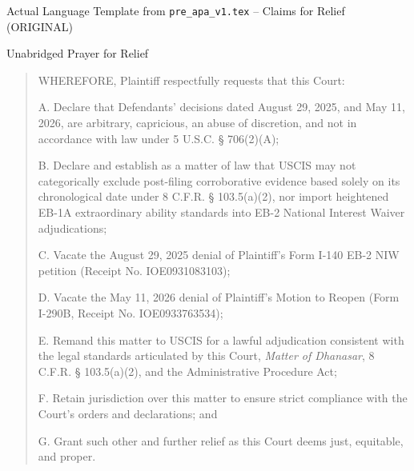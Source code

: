\documentclass[11pt]{beamer}
\begin{document}
	\begin{frame}[allowframebreaks]{Actual Language Template from \texttt{pre\_apa\_v1.tex} -- Claims for Relief (ORIGINAL)}
		\scriptsize
		\begin{block}{Unabridged Prayer for Relief}
			\begin{quote}
				WHEREFORE, Plaintiff respectfully requests that this Court:
				
				A. Declare that Defendants' decisions dated August 29, 2025, and May 11, 2026, are arbitrary, capricious, an abuse of discretion, and not in accordance with law under 5 U.S.C. § 706(2)(A);
				
				B. Declare and establish as a matter of law that USCIS may not categorically exclude post-filing corroborative evidence based solely on its chronological date under 8 C.F.R. § 103.5(a)(2), nor import heightened EB-1A extraordinary ability standards into EB-2 National Interest Waiver adjudications;
				
				C. Vacate the August 29, 2025 denial of Plaintiff's Form I-140 EB-2 NIW petition (Receipt No. IOE0931083103);
				
				D. Vacate the May 11, 2026 denial of Plaintiff's Motion to Reopen (Form I-290B, Receipt No. IOE0933763534);
				
				E. Remand this matter to USCIS for a lawful adjudication consistent with the legal standards articulated by this Court, \textit{Matter of Dhanasar}, 8 C.F.R. § 103.5(a)(2), and the Administrative Procedure Act;
				
				F. Retain jurisdiction over this matter to ensure strict compliance with the Court's orders and declarations; and
				
				G. Grant such other and further relief as this Court deems just, equitable, and proper.
			\end{quote}
		\end{block}
	\end{frame}
	
	
\end{document}
